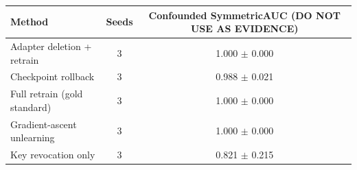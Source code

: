 \begin{tabular}{lcc}
\toprule
Method & Seeds & Confounded SymmetricAUC (DO NOT USE AS EVIDENCE) \\
\midrule
Adapter deletion + retrain & 3 & 1.000 $\pm$ 0.000 \\
Checkpoint rollback & 3 & 0.988 $\pm$ 0.021 \\
Full retrain (gold standard) & 3 & 1.000 $\pm$ 0.000 \\
Gradient-ascent unlearning & 3 & 1.000 $\pm$ 0.000 \\
Key revocation only & 3 & 0.821 $\pm$ 0.215 \\
\bottomrule
\end{tabular}
